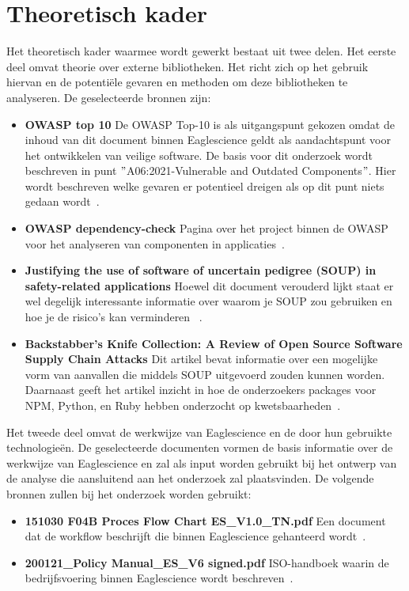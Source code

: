 \section{Theoretisch kader}\label{sec:theoretisch-kader}
Het theoretisch kader waarmee wordt gewerkt bestaat uit twee delen. Het eerste deel omvat theorie over externe bibliotheken. Het richt zich op het gebruik hiervan en de potentiële gevaren en methoden om deze bibliotheken te analyseren. De geselecteerde bronnen zijn:
\begin{itemize}
    \item \textbf{OWASP top 10}
    De OWASP Top-10 is als uitgangspunt gekozen omdat de inhoud van dit document binnen Eaglescience geldt als aandachtspunt voor het ontwikkelen van veilige software. De basis voor dit onderzoek wordt beschreven in punt $"$A06:2021-Vulnerable and Outdated Components$"$. Hier wordt beschreven welke gevaren er potentieel dreigen als op dit punt niets gedaan wordt~\citep{OWASP:2021}.
    \item \textbf{OWASP dependency-check} Pagina over het project binnen de OWASP voor het analyseren van componenten in applicaties~\citep{OWASP:2017}.
    \item \textbf{Justifying the use of software of uncertain pedigree (SOUP) in safety-related applications} Hoewel dit document verouderd lijkt staat er wel degelijk interessante informatie over waarom je SOUP zou gebruiken en hoe je de risico's kan verminderen~\citep{Bischop:2001} .
    \item \textbf{Backstabber’s Knife Collection: A Review of Open Source Software Supply Chain Attacks} Dit artikel bevat informatie over een mogelijke vorm van aanvallen die middels SOUP uitgevoerd zouden kunnen worden. Daarnaast geeft het artikel inzicht in hoe de onderzoekers packages voor NPM, Python, en Ruby hebben onderzocht op kwetsbaarheden~\citep{Ohm:2020}.
\end{itemize}
Het tweede deel omvat de werkwijze van Eaglescience en de door hun gebruikte technologieën. De geselecteerde documenten vormen de basis informatie over de werkwijze van Eaglescience en zal als input worden gebruikt bij het ontwerp van de analyse die aansluitend aan het onderzoek zal plaatsvinden. De volgende bronnen zullen bij het onderzoek worden gebruikt:
\begin{itemize}
    \item \textbf{151030 F04B Proces Flow Chart ES\_V1.0\_TN.pdf} Een document dat de workflow beschrijft die binnen Eaglescience gehanteerd wordt~\citep{Eaglescience:2015}.
    \item \textbf{200121\_Policy Manual\_ES\_V6 signed.pdf} ISO-handboek waarin de bedrijfsvoering binnen Eaglescience wordt beschreven~\citep{Eaglescience:2020}.
\end{itemize}

